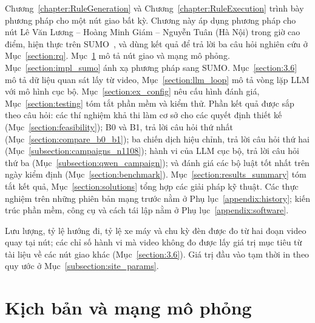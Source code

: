 \documentclass[../main.tex]{subfiles}
\begin{document}

Chương~\ref{chapter:RuleGeneration} và Chương~\ref{chapter:RuleExecution} trình bày phương pháp cho một nút giao bất kỳ. Chương này áp dụng phương pháp cho nút Lê Văn Lương -- Hoàng Minh Giám -- Nguyễn Tuân (Hà Nội) trong giờ cao điểm, hiện thực trên SUMO~\cite{lopez2018sumo}, và dùng kết quả để trả lời ba câu hỏi nghiên cứu ở Mục~\ref{section:rq}. Mục~\ref{section:3.2} mô tả nút giao và mạng mô phỏng. Mục~\ref{section:impl_sumo} ánh xạ phương pháp sang SUMO. Mục~\ref{section:3.6} mô tả dữ liệu quan sát lấy từ video, Mục~\ref{section:llm_loop} mô tả vòng lặp LLM với mô hình cục bộ. Mục~\ref{section:ex_config} nêu cấu hình đánh giá, Mục~\ref{section:testing} tóm tắt phần mềm và kiểm thử. Phần kết quả được sắp theo câu hỏi: các thí nghiệm khả thi làm cơ sở cho các quyết định thiết kế (Mục~\ref{section:feasibility}); B0 và B1, trả lời câu hỏi thứ nhất (Mục~\ref{section:compare_b0_b1}); ba chiến dịch hiệu chỉnh, trả lời câu hỏi thứ hai (Mục~\ref{subsection:campaigns_n1108}); hành vi của LLM cục bộ, trả lời câu hỏi thứ ba (Mục~\ref{subsection:qwen_campaign}); và đánh giá các bộ luật tốt nhất trên ngày kiểm định (Mục~\ref{section:benchmark}). Mục~\ref{section:results_summary} tóm tắt kết quả, Mục~\ref{section:solutions} tổng hợp các giải pháp kỹ thuật. Các thực nghiệm trên những phiên bản mạng trước nằm ở Phụ lục~\ref{appendix:history}; kiến trúc phần mềm, công cụ và cách tái lập nằm ở Phụ lục~\ref{appendix:software}.

Lưu lượng, tỷ lệ hướng đi, tỷ lệ xe máy và chu kỳ đèn được đo từ hai đoạn video quay tại nút; các chỉ số hành vi mà video không đo được lấy giá trị mục tiêu từ tài liệu về các nút giao khác (Mục~\ref{section:3.6}). Giá trị đầu vào tạm thời in  theo quy ước ở Mục~\ref{subsection:site_params}.

\section{Kịch bản và mạng mô phỏng}
\label{section:3.2}
\end{document}
